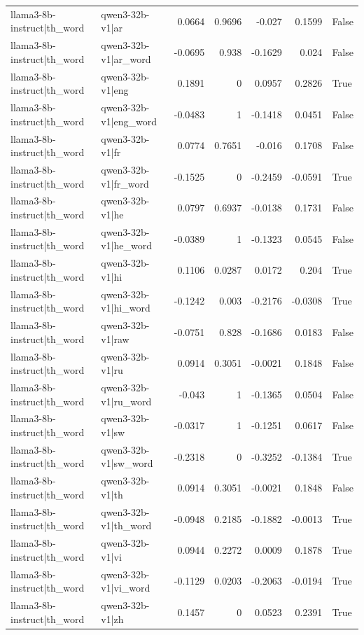 \begin{table}
\begin{tabular}{l l r r r r l}
llama3-8b-instruct|th_word & qwen3-32b-v1|ar & 0.0664 & 0.9696 & -0.027 & 0.1599 & False \\
llama3-8b-instruct|th_word & qwen3-32b-v1|ar_word & -0.0695 & 0.938 & -0.1629 & 0.024 & False \\
llama3-8b-instruct|th_word & qwen3-32b-v1|eng & 0.1891 & 0 & 0.0957 & 0.2826 & True \\
llama3-8b-instruct|th_word & qwen3-32b-v1|eng_word & -0.0483 & 1 & -0.1418 & 0.0451 & False \\
llama3-8b-instruct|th_word & qwen3-32b-v1|fr & 0.0774 & 0.7651 & -0.016 & 0.1708 & False \\
llama3-8b-instruct|th_word & qwen3-32b-v1|fr_word & -0.1525 & 0 & -0.2459 & -0.0591 & True \\
llama3-8b-instruct|th_word & qwen3-32b-v1|he & 0.0797 & 0.6937 & -0.0138 & 0.1731 & False \\
llama3-8b-instruct|th_word & qwen3-32b-v1|he_word & -0.0389 & 1 & -0.1323 & 0.0545 & False \\
llama3-8b-instruct|th_word & qwen3-32b-v1|hi & 0.1106 & 0.0287 & 0.0172 & 0.204 & True \\
llama3-8b-instruct|th_word & qwen3-32b-v1|hi_word & -0.1242 & 0.003 & -0.2176 & -0.0308 & True \\
llama3-8b-instruct|th_word & qwen3-32b-v1|raw & -0.0751 & 0.828 & -0.1686 & 0.0183 & False \\
llama3-8b-instruct|th_word & qwen3-32b-v1|ru & 0.0914 & 0.3051 & -0.0021 & 0.1848 & False \\
llama3-8b-instruct|th_word & qwen3-32b-v1|ru_word & -0.043 & 1 & -0.1365 & 0.0504 & False \\
llama3-8b-instruct|th_word & qwen3-32b-v1|sw & -0.0317 & 1 & -0.1251 & 0.0617 & False \\
llama3-8b-instruct|th_word & qwen3-32b-v1|sw_word & -0.2318 & 0 & -0.3252 & -0.1384 & True \\
llama3-8b-instruct|th_word & qwen3-32b-v1|th & 0.0914 & 0.3051 & -0.0021 & 0.1848 & False \\
llama3-8b-instruct|th_word & qwen3-32b-v1|th_word & -0.0948 & 0.2185 & -0.1882 & -0.0013 & True \\
llama3-8b-instruct|th_word & qwen3-32b-v1|vi & 0.0944 & 0.2272 & 0.0009 & 0.1878 & True \\
llama3-8b-instruct|th_word & qwen3-32b-v1|vi_word & -0.1129 & 0.0203 & -0.2063 & -0.0194 & True \\
llama3-8b-instruct|th_word & qwen3-32b-v1|zh & 0.1457 & 0 & 0.0523 & 0.2391 & True \\

\end{tabular}
\end{table}
